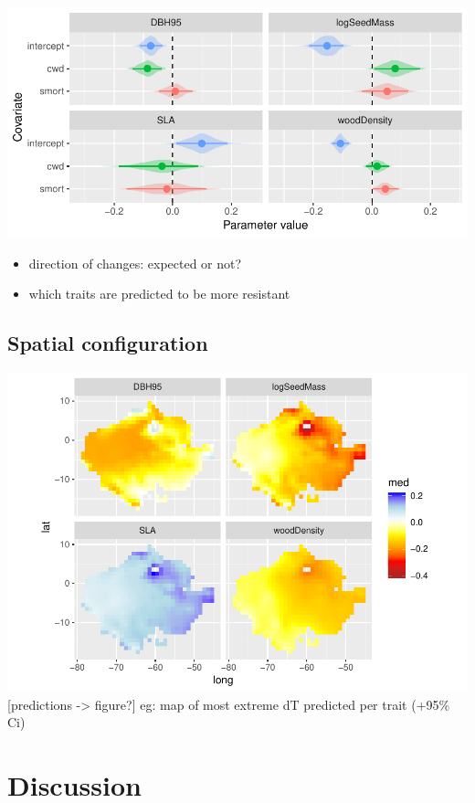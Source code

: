 \documentclass[]{elsarticle} %
\makeatletter
\def\maxwidth{\ifdim\Gin@nat@width>\linewidth\linewidth
\else\Gin@nat@width\fi}
\let\Oldincludegraphics\includegraphics
\renewcommand{\includegraphics}[1]{\Oldincludegraphics[width=\maxwidth]{#1}}
\makeatother
\begin{document}
\includegraphics{rticle_tmfo_functional_files/figure-latex/fig_lambdas-1.pdf}

\begin{itemize}
\item
  direction of changes: expected or not?
\item
  which traits are predicted to be more resistant
\end{itemize}

\subsection{Spatial configuration}\label{spatial-configuration}

\includegraphics{rticle_tmfo_functional_files/figure-latex/fig_maps_pred-1.pdf}
{[}predictions -\textgreater{} figure?{]} eg: map of most extreme dT
predicted per trait (+95\% Ci)

\section{Discussion}\label{discussion}
\end{document}
